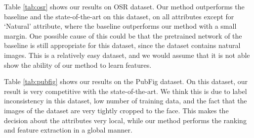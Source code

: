 Table \ref{tab:osr} shows our results on OSR dataset. Our method outperforms the baseline and the state-of-the-art on this dataset, on all attributes except for `Natural' attribute, where the baseline outperforms our method with a small margin. One possible cause of this could be that the pretrained network of the baseline is still appropriate for this dataset, since the dataset contains natural images. This is a relatively easy dataset, and we would assume that it is not able show the ability of our method to learn features.

\begin{table}[t!]
\caption{Results for the OSR dataset}
\centering
{}
\label{tab:osr}
\end{table}

Table \ref{tab:pubfig} shows our results on the PubFig dataset. On this dataset, our result is very competitive with the state-of-the-art. We think this is due to label inconsistency in this dataset, low number of training data, and the fact that the images of the dataset are very tightly cropped to the face. This makes the decision about the attributes very local, while our method performs the ranking and feature extraction in a global manner.


